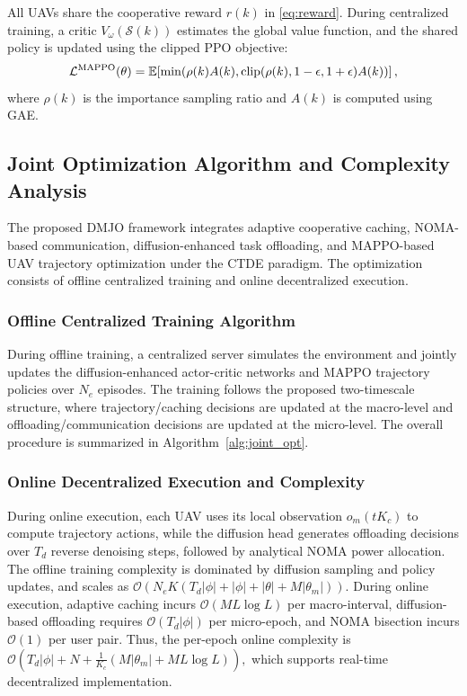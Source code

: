 \documentclass[journal]{IEEEtran}
\begin{document}
All UAVs share the cooperative reward $r(k)$ in \eqref{eq:reward}. During centralized training, a critic $V_{\omega}(\mathcal{S}(k))$ estimates the global value function, and the shared policy is updated using the clipped PPO objective:
\begin{equation}
\small
\mathcal{L}^{\mathrm{MAPPO}}(\theta)=
\mathbb{E}\!\left[
\min\!\left(
\rho(k)A(k),
\mathrm{clip}(\rho(k),1-\epsilon,1+\epsilon)A(k)
\right)
\right],
\end{equation}
where $\rho(k)$ is the importance sampling ratio and $A(k)$ is computed using GAE.

\subsection{Joint Optimization Algorithm and Complexity Analysis}

The proposed DMJO framework integrates adaptive cooperative caching, NOMA-based communication, diffusion-enhanced task offloading, and MAPPO-based UAV trajectory optimization under the CTDE paradigm. The optimization consists of offline centralized training and online decentralized execution.

\subsubsection{Offline Centralized Training Algorithm}

During offline training, a centralized server simulates the environment and jointly updates the diffusion-enhanced actor-critic networks and MAPPO trajectory policies over $N_e$ episodes. The training follows the proposed two-timescale structure, where trajectory/caching decisions are updated at the macro-level and offloading/communication decisions are updated at the micro-level. The overall procedure is summarized in Algorithm~\ref{alg:joint_opt}.

\subsubsection{Online Decentralized Execution and Complexity}

During online execution, each UAV uses its local observation $o_m(tK_c)$ to compute trajectory actions, while the diffusion head generates offloading decisions over $T_d$ reverse denoising steps, followed by analytical NOMA power allocation. The offline training complexity is dominated by diffusion sampling and policy updates, and scales as $\mathcal{O}\!\left(N_eK\left(T_d|\phi|+|\phi|+|\theta|+M|\theta_m|\right)\right).$ During online execution, adaptive caching incurs $\mathcal{O}(ML\log L)$ per macro-interval, diffusion-based offloading requires $\mathcal{O}(T_d|\phi|)$ per micro-epoch, and NOMA bisection incurs $\mathcal{O}(1)$ per user pair. Thus, the per-epoch online complexity is $\mathcal{O}\!\left(T_d|\phi|+N+\frac{1}{K_c}\left(M|\theta_m|+ML\log L\right)\right),$ which supports real-time decentralized implementation.
\end{document}
